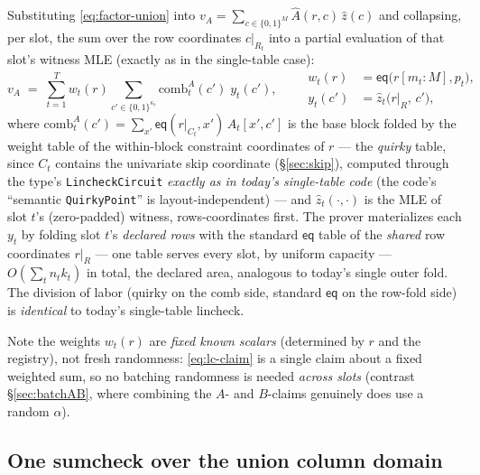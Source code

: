 \documentclass[11pt]{article}
\newcommand{\eq}{\mathsf{eq}}
\newcommand{\code}[1]{\texttt{#1}}
\theoremstyle{definition}
\begin{document}
Substituting \eqref{eq:factor-union} into
$v_A = \sum_{c \in \{0,1\}^M} \hat A(r, c)\, \hat z(c)$ and
collapsing, per slot, the sum over the row coordinates $c|_{R_t}$ into a
partial evaluation of that slot's witness MLE (exactly as in the
single-table case):
\begin{equation}\label{eq:lc-claim}
  v_A \;=\; \sum_{t=1}^{T} w_t(r) \sum_{c' \in \{0,1\}^{\kappa_t}}
      \mathrm{comb}^A_t(c')\; y_t(c'),
  \qquad
  \begin{aligned}
    w_t(r) &= \eq\bigl(r[m_t{:}M], p_t\bigr),\\
    y_t(c') &= \hat z_t\bigl(r|_{R},\, c'\bigr),
  \end{aligned}
\end{equation}
where
$\mathrm{comb}^A_t(c') = \sum_{x'} \eq(r|_{C_t}, x')\, A_t[x', c']$
is the base block folded by the weight table of the within-block
constraint coordinates of $r$ --- the \emph{quirky} table, since $C_t$
contains the univariate skip coordinate (\S\ref{sec:skip}), computed
through the type's \code{LincheckCircuit} \emph{exactly as in today's
single-table code} (the code's ``semantic \code{QuirkyPoint}'' is
layout-independent) --- and $\hat z_t(\cdot,\cdot)$ is the MLE of slot
$t$'s (zero-padded) witness, rows-coordinates first. The prover
materializes each $y_t$ by folding slot $t$'s \emph{declared rows} with
the standard $\eq$ table of the \emph{shared} row coordinates $r|_{R}$
--- one table serves every slot, by uniform capacity ---
$O(\sum_t n_t k_t)$ in total, the declared area, analogous to today's
single outer fold. The division of labor (quirky on the comb side,
standard $\eq$ on the row-fold side) is \emph{identical} to today's
single-table lincheck.

Note the weights $w_t(r)$ are \emph{fixed known scalars} (determined by $r$
and the registry), not fresh randomness: \eqref{eq:lc-claim} is a single
claim about a fixed weighted sum, so no batching randomness is needed
\emph{across slots} (contrast \S\ref{sec:batchAB}, where combining the
$A$- and $B$-claims genuinely does use a random $\alpha$).

\subsection{One sumcheck over the union column domain}\label{sec:multisize}
\end{document}
